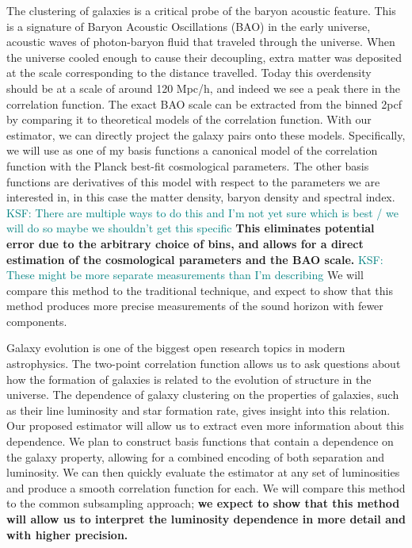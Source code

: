 \documentclass[12pt, fullpage, letterpaper]{article}
\newcommand{\KSF}[1]{\textcolor{teal}{KSF: #1}}
\newcommand{\cf}{2pcf\xspace}
\begin{document}
The clustering of galaxies is a critical probe of the baryon acoustic feature. 
This is a signature of Baryon Acoustic Oscillations (BAO) in the early universe, acoustic waves of photon-baryon fluid that traveled through the universe. 
When the universe cooled enough to cause their decoupling, extra matter was deposited at the scale corresponding to the distance travelled. 
Today this overdensity should be at a scale of around 120 Mpc/h, and indeed we see a peak there in the correlation function. 
The exact BAO scale can be extracted from the binned \cf by comparing it to theoretical models of the correlation function. 
With our estimator, we can directly project the galaxy pairs onto these models. 
Specifically, we will use as one of my basis functions a canonical model of the correlation function with the Planck best-fit cosmological parameters. 
The other basis functions are derivatives of this model with respect to the parameters we are interested in, in this case the matter density, baryon density and spectral index. \KSF{There are multiple ways to do this and I'm not yet sure which is best / we will do so maybe we shouldn't get this specific}
\textbf{This eliminates potential error due to the arbitrary choice of bins, and allows for a direct estimation of the cosmological parameters and the BAO scale.} \KSF{These might be more separate measurements than I'm describing}
We will compare this method to the traditional technique, and expect to show that this method produces more precise measurements of the sound horizon with fewer components.

Galaxy evolution is one of the biggest open research topics in modern astrophysics.
The two-point correlation function allows us to ask questions about how the formation of galaxies is related to the evolution of structure in the universe.
The dependence of galaxy clustering on the properties of galaxies, such as their line luminosity and star formation rate, gives insight into this relation.
Our proposed estimator will allow us to extract even more information about this dependence. 
We plan to construct basis functions that contain a dependence on the galaxy property, allowing for a combined encoding of both separation and luminosity. 
We can then quickly evaluate the estimator at any set of luminosities and produce a smooth correlation function for each. 
We will compare this method to the common subsampling approach; \textbf{we expect to show that this method will allow us to interpret the luminosity dependence in more detail and with higher precision.}
\end{document}
